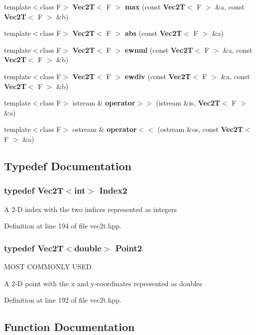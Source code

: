 \begin{CompactItemize}
template$<$class F$>$ {\bf Vec2T}$<$ F $>$ {\bf max} (const {\bf Vec2T}$<$ F $>$ \&a, const {\bf Vec2T}$<$ F $>$ \&b)
\item 
template$<$class F$>$ {\bf Vec2T}$<$ F $>$ {\bf abs} (const {\bf Vec2T}$<$ F $>$ \&a)
\item 
template$<$class F$>$ {\bf Vec2T}$<$ F $>$ {\bf ewmul} (const {\bf Vec2T}$<$ F $>$ \&a, const {\bf Vec2T}$<$ F $>$ \&b)
\item 
template$<$class F$>$ {\bf Vec2T}$<$ F $>$ {\bf ewdiv} (const {\bf Vec2T}$<$ F $>$ \&a, const {\bf Vec2T}$<$ F $>$ \&b)
\item 
template$<$class F$>$ istream \& {\bf operator$>$$>$} (istream \&is, {\bf Vec2T}$<$ F $>$ \&a)
\item 
template$<$class F$>$ ostream \& {\bf operator$<$$<$} (ostream \&os, const {\bf Vec2T}$<$ F $>$ \&a)
\end{CompactItemize}


\subsection{Typedef Documentation}
\subsubsection{\setlength{\rightskip}{0pt plus 5cm}typedef {\bf Vec2T}$<$int$>$ {\bf Index2}}\label{vec2t_8hpp_c359e4d7286c4c5799177773fc777b7f_c359e4d7286c4c5799177773fc777b7f}


A 2-D index with the two indices represented as integers 

Definition at line 194 of file vec2t.hpp.
\subsubsection{\setlength{\rightskip}{0pt plus 5cm}typedef {\bf Vec2T}$<$double$>$ {\bf Point2}}\label{vec2t_8hpp_ba50e852b485fe4ca894c013d8d7d6c9_ba50e852b485fe4ca894c013d8d7d6c9}


MOST COMMONLY USED. 

A 2-D point with the x and y-coordinates represented as doubles 

Definition at line 192 of file vec2t.hpp.

\subsection{Function Documentation}

